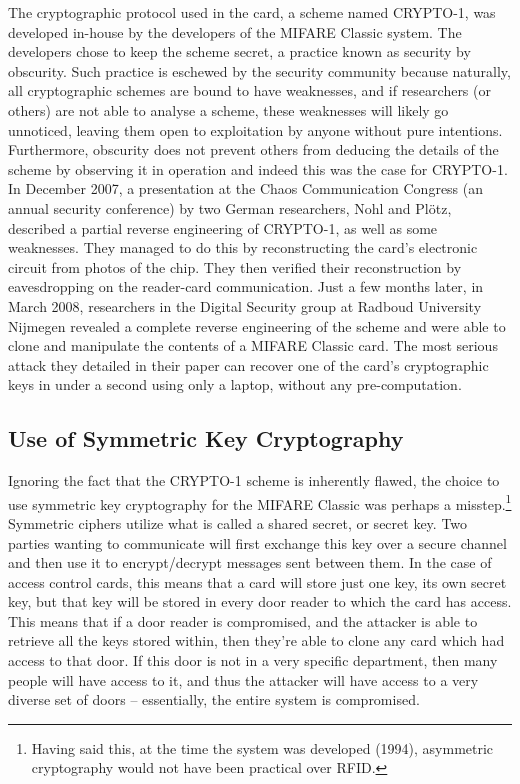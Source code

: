 \documentclass[12pt,a4paper,twoside,openright]{report}
\begin{document}
The cryptographic protocol used in the card, a scheme named CRYPTO-1, was developed in-house by the developers of the MIFARE Classic system. The developers chose to keep the scheme secret, a practice known as security by obscurity. Such practice is eschewed by the security community because naturally, all cryptographic schemes are bound to have weaknesses, and if researchers (or others) are not able to analyse a scheme, these weaknesses will likely go unnoticed, leaving them open to exploitation by anyone without pure intentions. Furthermore, obscurity does not prevent others from deducing the details of the scheme by observing it in operation and indeed this was the case for CRYPTO-1. In December 2007, a presentation at the Chaos Communication Congress (an annual security conference) by two German researchers, Nohl and Pl{\"o}tz, described a partial reverse engineering of CRYPTO-1, as well as some weaknesses. They managed to do this by reconstructing the card's electronic circuit from photos of the chip. They then verified their reconstruction by eavesdropping on the reader-card communication. Just a few months later, in March 2008, researchers in the Digital Security group at Radboud University Nijmegen revealed a complete reverse engineering of the scheme and were able to clone and manipulate the contents of a MIFARE Classic card. The most serious attack they detailed in their paper \cite{nestedattack} can recover one of the card's cryptographic keys in under a second using only a laptop, without any pre-computation.

\subsection{Use of Symmetric Key Cryptography}

Ignoring the fact that the CRYPTO-1 scheme is inherently flawed, the choice to use symmetric key cryptography for the MIFARE Classic was perhaps a misstep.\footnote{Having said this, at the time the system was developed (1994), asymmetric cryptography would not have been practical over RFID.} Symmetric ciphers utilize what is called a shared secret, or secret key. Two parties wanting to communicate will first exchange this key over a secure channel and then use it to encrypt/decrypt messages sent between them. In the case of access control cards, this means that a card will store just one key, its own secret key, but that key will be stored in every door reader to which the card has access. This means that if a door reader is compromised, and the attacker is able to retrieve all the keys stored within, then they're able to clone any card which had access to that door. If this door is not in a very specific department, then many people will have access to it, and thus the attacker will have access to a very diverse set of doors -- essentially, the entire system is compromised.
\end{document}
